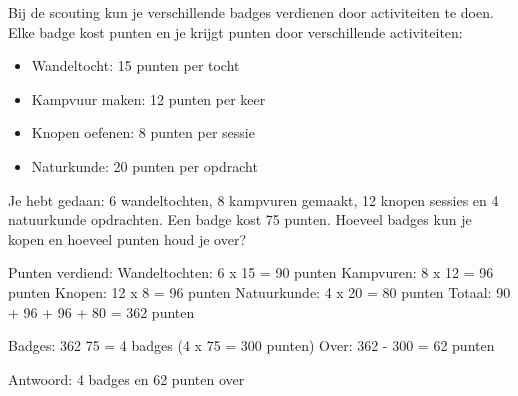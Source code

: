 \begin{opgave}
Bij de scouting kun je verschillende badges verdienen door activiteiten te doen.
Elke badge kost punten en je krijgt punten door verschillende activiteiten:

\begin{itemize}
\item Wandeltocht: 15 punten per tocht
\item Kampvuur maken: 12 punten per keer
\item Knopen oefenen: 8 punten per sessie
\item Naturkunde: 20 punten per opdracht
\end{itemize}

Je hebt gedaan: 6 wandeltochten, 8 kampvuren gemaakt, 12 knopen sessies en
4 natuurkunde opdrachten. Een badge kost 75 punten. Hoeveel badges kun je kopen
en hoeveel punten houd je over?
\end{opgave}

\begin{oplossing}
Punten verdiend:
Wandeltochten: 6 x 15 = 90 punten
Kampvuren: 8 x 12 = 96 punten
Knopen: 12 x 8 = 96 punten
Natuurkunde: 4 x 20 = 80 punten
Totaal: 90 + 96 + 96 + 80 = 362 punten

Badges: 362 \textrm{\textdiv} 75 = 4 badges (4 x 75 = 300 punten)
Over: 362 - 300 = 62 punten

Antwoord: 4 badges en 62 punten over
\end{oplossing}